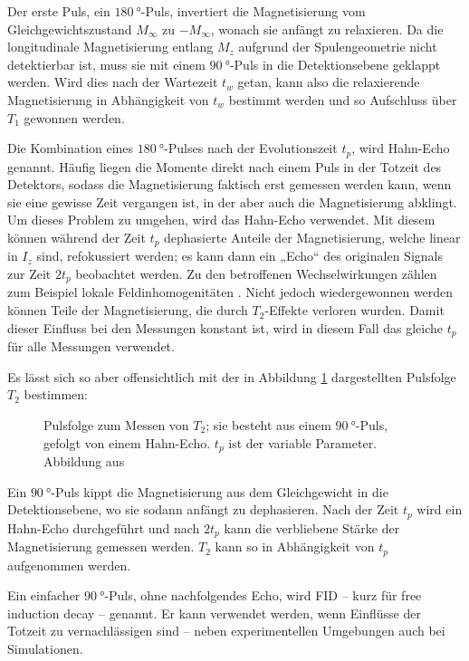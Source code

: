 Der erste Puls, ein $\SI{180}{\degree}$-Puls, invertiert die Magnetisierung vom Gleichgewichtszustand $M_\infty$ zu $-M_\infty$, wonach sie anfängt zu relaxieren. Da die longitudinale Magnetisierung entlang $M_z$ aufgrund der Spulengeometrie nicht detektierbar ist, muss sie mit einem $\SI{90}{\degree}$-Puls in die Detektionsebene geklappt werden. Wird dies nach der Wartezeit $t_w$ getan, kann also die relaxierende Magnetisierung in Abhängigkeit von $t_w$ bestimmt werden und so Aufschluss über $T_1$ gewonnen werden.

Die Kombination eines $\SI{180}{\degree}$-Pulses nach der Evolutionszeit $t_p$, wird Hahn-Echo genannt. Häufig liegen die Momente direkt nach einem Puls in der Totzeit des Detektors, sodass die Magnetisierung faktisch erst gemessen werden kann, wenn sie eine gewisse Zeit vergangen ist, in der aber auch die Magnetisierung abklingt. Um dieses Problem zu umgehen, wird das Hahn-Echo verwendet. Mit diesem können während der Zeit $t_p$ dephasierte Anteile der Magnetisierung, welche linear in $I_z$ sind, refokussiert werden; es kann dann ein „Echo“ des originalen Signals zur Zeit $2 t_p$ beobachtet werden. Zu den betroffenen Wechselwirkungen zählen zum Beispiel lokale Feldinhomogenitäten \cite[S.302]{levitt}. Nicht jedoch wiedergewonnen werden können Teile der Magnetisierung, die durch $T_2$-Effekte verloren wurden. Damit dieser Einfluss bei den Messungen konstant ist, wird in diesem Fall das gleiche $t_p$ für alle Messungen verwendet.

Es lässt sich so aber offensichtlich mit der in Abbildung \ref{fig:theo:pulsT2} dargestellten Pulsfolge $T_2$ bestimmen:
\begin{figure}
	\begin{center}
		
	\end{center}
	\caption{Pulsfolge zum Messen von $T_2$; sie besteht aus einem $\SI{90}{\degree}$-Puls, gefolgt von einem Hahn-Echo. $t_p$ ist der variable Parameter. Abbildung aus \cite{joachim_master}}\label{fig:theo:pulsT2}
\end{figure}
Ein $\SI{90}{\degree}$-Puls kippt die Magnetisierung aus dem Gleichgewicht in die Detektionsebene, wo sie sodann anfängt zu dephasieren. Nach der Zeit $t_p$ wird ein Hahn-Echo durchgeführt und nach $2 t_p$ kann die verbliebene Stärke der Magnetisierung gemessen werden. $T_2$ kann so in Abhängigkeit von $t_p$ aufgenommen werden.

Ein einfacher $\SI{90}{\degree}$-Puls, ohne nachfolgendes Echo, wird FID -- kurz für free induction decay -- genannt. Er kann verwendet werden, wenn Einflüsse der Totzeit zu vernachlässigen sind -- neben experimentellen Umgebungen auch bei Simulationen.

